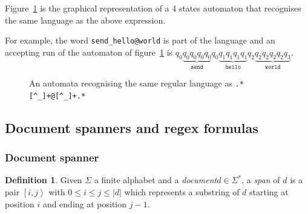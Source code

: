 \documentclass[12px]{article}
\theoremstyle{definition}
\newtheorem{definition}{Definition}
\newcommand{\Span}[1]{\left[ #1 \right\rangle}
\begin{document}
        Figure~\ref{fig:automata_simple} is the graphical representation of a 4
        states automaton that recognises the same language as the above
        expression.

        For example, the word \texttt{send\_hello@world} is part of the
        language and an accepting run of the automaton of
        figure~\ref{fig:automata_simple} is $q_0 \underbrace{q_0 q_0 q_0
        q_0}_\texttt{send} q_0 \underbrace{q_1q_1q_1q_1}_\texttt{hello} q_2
        \underbrace{q_2 q_2 q_2 q_2 q_3}_\texttt{world}$.

        \begin{figure}[ht]
          \centering
          \caption{%
            An automata recognising the same regular language as
            \texttt{.*[\textasciicircum\_]+@[\textasciicircum\_]+.*}
          }%
          \label{fig:automata_simple}
        \end{figure}

    \subsection{Document spanners and regex formulas}

      \subsubsection{Document spanner}

        \begin{definition}
          Given $\Sigma$ a finite alphabet and a \textit{document}$ d \in
          \Sigma^*$, a \textit{span} of $d$ is a pair $\Span{i, j}$ with $0
          \leq i \leq j \leq |d|$ which represents a substring of $d$ starting
          at position $i$ and ending at position $j - 1$.
        \end{definition}
\end{document}
